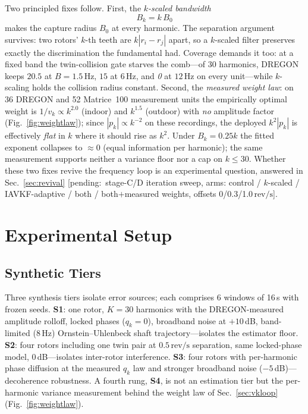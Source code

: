 \documentclass[journal]{IEEEtran}
\newcommand{\revps}{\ensuremath{\,\mathrm{rev/s}}}
\newcommand{\pending}[1]{{\color{gray}\textsf{[pending:~#1]}}}
\begin{document}
Two principled fixes follow. First, the \emph{$k$-scaled bandwidth}
\begin{equation}
  B_k = k\, B_0
  \label{eq:kscaled}
\end{equation}
makes the capture radius $B_0$ at every harmonic. The separation argument
survives: two rotors' $k$-th teeth are $k|r_i - r_j|$ apart, so a
$k$-scaled filter preserves exactly the discrimination the fundamental
had. Coverage demands it too: at a fixed band the twin-collision gate
starves the comb---of 30 harmonics, DREGON keeps $20.5$ at $B = 1.5$\,Hz,
$15$ at $6$\,Hz, and \emph{0} at $12$\,Hz on every unit---while
$k$-scaling holds the collision radius constant. Second, the
\emph{measured weight law}: on 36 DREGON and 52 Matrice~100 measurement
units the empirically optimal weight is $1/v_k \propto k^{2.0}$ (indoor)
and $k^{1.5}$ (outdoor) with \emph{no} amplitude factor
(Fig.~\ref{fig:weightlaw}); since $|p_k| \propto k^{-2}$ on these
recordings, the deployed $k^2|p_k|$ is effectively \emph{flat} in $k$
where it should rise as $k^2$. Under $B_k = 0.25k$ the fitted exponent
collapses to ${\approx}0$ (equal information per harmonic); the same
measurement supports neither a variance floor nor a cap on $k \le 30$.
Whether these two fixes revive the frequency loop is an experimental
question, answered in Sec.~\ref{sec:revival} \pending{stage-C/D
iteration sweep, arms: control / $k$-scaled / IAVKF-adaptive / both /
both$+$measured weights, offsets 0/0.3/1.0\revps}.

\section{Experimental Setup}
\label{sec:setup}

\subsection{Synthetic Tiers}
Three synthesis tiers isolate error sources; each comprises 6 windows of
16\,s with frozen seeds. \textbf{S1}: one rotor, $K = 30$ harmonics with
the DREGON-measured amplitude rolloff, locked phases ($q_k = 0$),
broadband noise at $+10$\,dB, band-limited (8\,Hz) Ornstein--Uhlenbeck
shaft trajectory---isolates the estimator floor. \textbf{S2}: four rotors
including one twin pair at $0.5\revps$ separation, same locked-phase
model, 0\,dB---isolates inter-rotor interference. \textbf{S3}: four
rotors with per-harmonic phase diffusion at the measured $q_k$ law and
stronger broadband noise ($-5$\,dB)---decoherence robustness. A fourth
rung, \textbf{S4}, is not an estimation tier but the per-harmonic
variance measurement behind the weight law of Sec.~\ref{sec:vkloop}
(Fig.~\ref{fig:weightlaw}).
\end{document}
